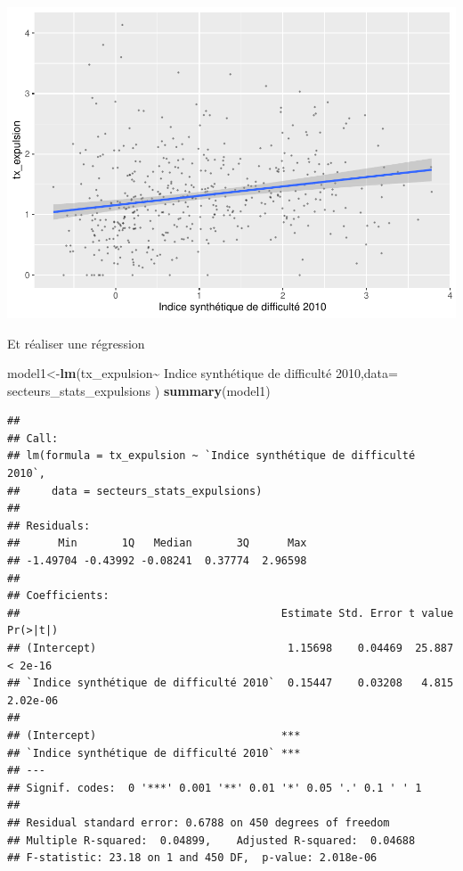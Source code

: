 \documentclass[
]{book}
\newenvironment{Shaded}{\begin{snugshade}}{\end{snugshade}}
\newcommand{\AttributeTok}[1]{\textcolor[rgb]{0.13,0.29,0.53}{#1}}
\newcommand{\FunctionTok}[1]{\textcolor[rgb]{0.13,0.29,0.53}{\textbf{#1}}}
\newcommand{\NormalTok}[1]{#1}
\newcommand{\OtherTok}[1]{\textcolor[rgb]{0.56,0.35,0.01}{#1}}
\newcommand{\SpecialCharTok}[1]{\textcolor[rgb]{0.81,0.36,0.00}{\textbf{#1}}}
\newcommand{\StringTok}[1]{\textcolor[rgb]{0.31,0.60,0.02}{#1}}
\begin{document}
\includegraphics{bookdown-demo_files/figure-latex/unnamed-chunk-37-1.pdf}

Et réaliser une régression

\begin{Shaded}
\begin{Highlighting}[]
\NormalTok{model1}\OtherTok{\textless{}{-}}\FunctionTok{lm}\NormalTok{(tx\_expulsion}\SpecialCharTok{\textasciitilde{}} \StringTok{\textasciigrave{}}\AttributeTok{Indice synthétique de difficulté 2010}\StringTok{\textasciigrave{}}\NormalTok{,}\AttributeTok{data=}\NormalTok{ secteurs\_stats\_expulsions )}
\FunctionTok{summary}\NormalTok{(model1)}
\end{Highlighting}
\end{Shaded}

\begin{verbatim}
## 
## Call:
## lm(formula = tx_expulsion ~ `Indice synthétique de difficulté 2010`, 
##     data = secteurs_stats_expulsions)
## 
## Residuals:
##      Min       1Q   Median       3Q      Max 
## -1.49704 -0.43992 -0.08241  0.37774  2.96598 
## 
## Coefficients:
##                                         Estimate Std. Error t value Pr(>|t|)
## (Intercept)                              1.15698    0.04469  25.887  < 2e-16
## `Indice synthétique de difficulté 2010`  0.15447    0.03208   4.815 2.02e-06
##                                            
## (Intercept)                             ***
## `Indice synthétique de difficulté 2010` ***
## ---
## Signif. codes:  0 '***' 0.001 '**' 0.01 '*' 0.05 '.' 0.1 ' ' 1
## 
## Residual standard error: 0.6788 on 450 degrees of freedom
## Multiple R-squared:  0.04899,    Adjusted R-squared:  0.04688 
## F-statistic: 23.18 on 1 and 450 DF,  p-value: 2.018e-06
\end{verbatim}
\end{document}

